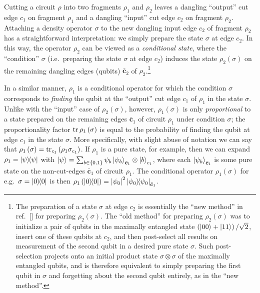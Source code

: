 \documentclass[nofootinbib,notitlepage,11pt]{revtex4-2}
\newcommand{\p}[1]{\left(#1\right)} %
\renewcommand{\set}[1]{\left\{#1\right\}} %
\renewcommand{\v}{\bm} %
\begin{document}
Cutting a circuit $\rho$ into two fragments $\rho_1$ and $\rho_2$
leaves a dangling ``output'' cut edge $c_1$ on fragment $\rho_1$ and a
dangling ``input'' cut edge $c_2$ on fragment $\rho_2$.  Attaching a
density operator $\sigma$ to the new dangling input edge $c_2$ of
fragment $\rho_2$ has a straightforward interpretation: we simply
prepare the state $\sigma$ at edge $c_2$.  In this way, the operator
$\rho_2$ can be viewed as a {\it conditional state}, where the
``condition'' $\sigma$ (i.e.~preparing the state $\sigma$ at edge
$c_2$) induces the state $\rho_2\p{\sigma}$ on the remaining dangling
edges (qubits) $\bar{\v c}_2$ of $\rho_2$.\footnote{The preparation of
  a state $\sigma$ at edge $c_2$ is essentially the ``new method'' in
  ref.~[] for preparing
  $\rho_2\p{\sigma}$.  The ``old method'' for preparing
  $\rho_2\p{\sigma}$ was to initialize a pair of qubits in the
  maximally entangled state $\p{\ket{00}+\ket{11}}/\sqrt2$, insert one
  of these qubits at $c_2$, and then post-select all results on
  measurement of the second qubit in a desired pure state $\sigma$.
  Such post-selection projects onto an initial product state
  $\sigma\otimes\sigma$ of the maximally entangled qubits, and is
  therefore equivalent to simply preparing the first qubit in $\sigma$
  and forgetting about the second qubit entirely, as in the ``new
  method''.}

In a similar manner, $\rho_1$ is a conditional operator for which the
condition $\sigma$ corresponds to {\it finding} the qubit at the
``output'' cut edge $c_1$ of $\rho_1$ in the state $\sigma$.  Unlike
with the ``input'' case of $\rho_2\p{\sigma}$, however,
$\rho_1\p{\sigma}$ is only {\it proportional} to a state prepared on
the remaining edges $\bar{\v c}_1$ of circuit $\rho_1$ under condition
$\sigma$; the proportionality factor $\tr\rho_1\p{\sigma}$ is equal to
the probability of finding the qubit at edge $c_1$ in the state
$\sigma$.  More specifically, with slight abuse of notation we can say
that $\rho_1\p{\sigma}=\tr_{c_1}\p{\rho_1\sigma_{c_1}}$.  If $\rho_1$
is a pure state, for example, then we can expand $\rho_1 = \op\psi$
with
$\ket\psi = \sum_{b\in\set{0,1}} \psi_b \ket{\psi_b}_{\bar{\v c}_1}
\otimes \ket{b}_{c_1}$, where each $\ket{\psi_b}_{\bar{\v c}_1}$ is
some pure state on the non-cut-edges $\bar{\v c}_1$ of circuit
$\rho_1$.  The conditional operator $\rho_1\p{\sigma}$ for
e.g.~$\sigma=\op{0}$ is then
$\rho_1\p{\op{0}}=\abs{\psi_0}^2\op{\psi_0}_{\bar{\v c}_1}$.
\end{document}

